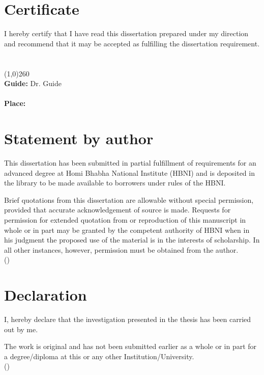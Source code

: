 \chapter*{{Certificate}}
\thispagestyle{empty}
I hereby certify that I have read this dissertation prepared under my direction
and recommend that it may be accepted as fulfilling the dissertation
requirement.\\\\\\
\line(1,0){260}\\
{\bf Guide: }{Dr. Guide}\\\\
{\bf Place: }
\clearpage

\chapter*{{Statement by author}}
\thispagestyle{empty}
This dissertation has been submitted in partial fulfillment of requirements
for an advanced degree at Homi Bhabha National Institute
(HBNI) and is deposited in the library to be made available to borrowers
under rules of the HBNI.

Brief quotations from this dissertation are allowable without special
permission, provided that accurate acknowledgement of source is made.
Requests for permission for extended quotation from or reproduction
of this manuscript in whole or in part may be granted by the competent
authority of HBNI when in his judgment the proposed use
of the material is in the interests of scholarship. In all other instances,
however, permission must be obtained from the author.\\[2.5cm]
\phantom{.}\hfill {(\student)}\phantom{XXX}

\chapter*{{Declaration}}
\thispagestyle{empty}

I, hereby declare that the investigation presented in the thesis has been
carried out by me.

The work is original and has not been submitted earlier as a whole
or in part for a degree/diploma at this or any other Institution/University.\\[2.5cm]
\phantom{.}\hfill {(\student)}\phantom{XXX}
